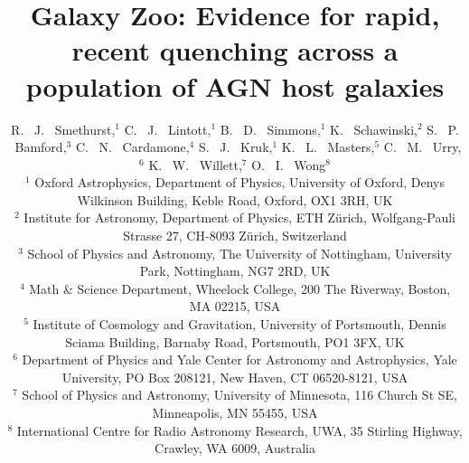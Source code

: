 \documentclass[useAMS,usenatbib]{mn2e}
\begin{document}
\title[Quenching Histories of AGN Host Galaxies]{Galaxy Zoo: Evidence for rapid, recent quenching across a population of AGN host galaxies}
\author[Smethurst et al. 2015]{R. ~J. ~Smethurst,$^{1}$ C. ~J. ~Lintott,$^{1}$ B. ~D. ~Simmons,$^{1}$ K. ~Schawinski,$^{2}$ \newauthor S. ~P. ~Bamford,$^{3}$  C. ~N. ~Cardamone,$^{4}$ S. ~J. ~Kruk,$^{1}$ K. ~L. ~Masters,$^{5}$ \newauthor C. ~M. ~Urry,$^{6}$  K. ~W. ~Willett,$^{7}$ O. ~I. ~Wong$^{8}$ \footnotemark[1]
\\ $^1$ Oxford Astrophysics, Department of Physics, University of Oxford, Denys Wilkinson Building, Keble Road, Oxford, OX1 3RH, UK 
\\ $^2$ Institute for Astronomy, Department of Physics, ETH Z\"urich, Wolfgang-Pauli Strasse 27, CH-8093 Z\"urich, Switzerland
\\ $^3$ School of Physics and Astronomy, The University of Nottingham, University Park, Nottingham, NG7 2RD, UK
\\ $^4$ Math \& Science Department, Wheelock College, 200 The Riverway, Boston, MA 02215, USA
\\ $^5$ Institute of Cosmology and Gravitation, University of Portsmouth, Dennis Sciama Building, Barnaby Road, Portsmouth, PO1 3FX, UK 
\\ $^6$ Department of Physics and Yale Center for Astronomy and Astrophysics, Yale University, PO Box 208121, New Haven, CT 06520-8121, USA
\\ $^7$ School of Physics and Astronomy, University of Minnesota, 116 Church St SE, Minneapolis, MN 55455, USA
\\ $^8$ International Centre for Radio Astronomy Research, UWA, 35 Stirling Highway, Crawley, WA 6009, Australia
}

\maketitle
\end{document}
